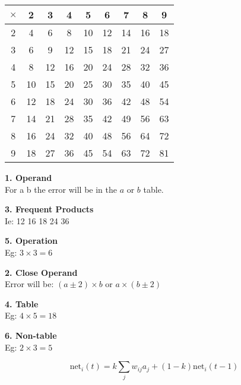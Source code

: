 \begin{slide*}

\begin{center}
\renewcommand{\arraystretch}{0.85}
\tabcolsep=3pt
\begin{tabular}{c|cccccccc}
$\times$&2&3&4&5&6&7&8&9\\
\hline
2&4& 6& 8& 10& 12& 14& 16& 18\\
3&6& 9& 12& 15& 18& 21& 24& 27\\
4&8& 12& 16& 20& 24& 28& 32& 36\\
5&10& 15& 20& 25& 30& 35& 40& 45\\
6&12& 18& 24& 30& 36& 42& 48& 54\\
7&14& 21& 28& 35& 42& 49& 56& 63\\
8&16& 24& 32& 40& 48& 56& 64& 72\\
9&18& 27& 36& 45& 54& 63& 72& 81\\
\end{tabular}

\newcommand{\vgap}{\vspace{4mm}}
\vgap
\begin{minipage}[t]{7.5 true cm}\raggedright
\parindent=0in
{\bf1. Operand}\\
For \x a b the error will be in the $a$ or $b$
table.\vgap

{\bf3. Frequent Products}\\
Ie: 12 16 18 24 36\vgap

{\bf5. Operation}\\
Eg: $3\times3=6$
\end{minipage}\hspace{1 true cm}%
\begin{minipage}[t]{7.5 true cm}
{\bf2. Close Operand}\\
Error will be: $(a \pm2)\times b$ or
$a\times (b\pm2)$\vgap

{\bf4. Table}\\
Eg: $4\times5=18$\vgap

{\bf6. Non-table}\\
Eg: $2\times3=5$
\end{minipage}
\end{center}

\end{slide*}


\begin{slide*}

\newcommand{\net}{\mbox{net}}
$$
\net_i (t) = k \sum\limits_j w_{ij}a_j + (1-k) \net_i (t-1)
$$



\end{slide*}

